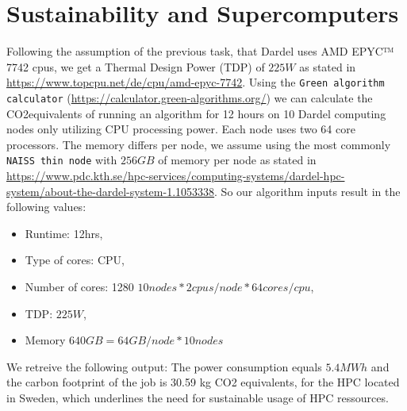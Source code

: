 \documentclass[a4paper,10pt]{article}
\begin{document}
\section{Sustainability and Supercomputers}
  Following the assumption of the previous task, that Dardel uses AMD EPYC™ 7742 cpus, we get a Thermal Design Power (TDP) of $ 225 W $ as stated in \url{https://www.topcpu.net/de/cpu/amd-epyc-7742}.
  Using the \verb|Green algorithm calculator| (\url{https://calculator.green-algorithms.org/}) we can calculate the CO2equivalents of running an algorithm for 12 hours on 10 Dardel computing nodes only utilizing CPU processing power.
  Each node uses two 64 core processors. The memory differs per node, we assume using the most commonly \verb|NAISS thin node| with $256GB $ of memory per node as stated in \url{https://www.pdc.kth.se/hpc-services/computing-systems/dardel-hpc-system/about-the-dardel-system-1.1053338}.
  So our algorithm inputs result in the following values:
  \begin{itemize}
    \item Runtime: 12hrs,
    \item Type of cores: CPU,
    \item Number of cores: 1280 $10 nodes*2 cpus/node*64cores/cpu$, 
    \item TDP: $225 W$,
    \item Memory $ 640 GB = 64GB/node * 10 nodes$
  \end{itemize}

  We retreive the following output:
  The power consumption equals $5.4 MWh$ and the carbon footprint of the job is 30.59 kg CO2 equivalents,
  for the HPC located in Sweden, which underlines the need for sustainable usage of HPC ressources.
 
 
 
\end{document}
